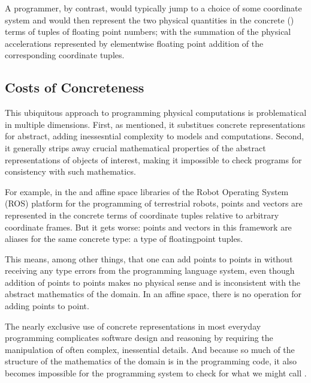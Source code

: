 \documentclass[letterpaper,10pt,english]{sphinxmanual}
\begin{document}
\sphinxAtStartPar
A programmer, by contrast, would typically jump to a choice
of some coordinate system and would then represent the two
physical quantities in the concrete () terms of
tuples of floating point numbers; with the summation of the
physical accelerations represented by element\sphinxhyphen{}wise floating
point addition of the corresponding coordinate tuples.


\subsection{Costs of Concreteness}
\label{\detokenize{A_00_Introduction:costs-of-concreteness}}
\sphinxAtStartPar
This ubiquitous approach to programming physical computations
is problematical in multiple dimensions. First, as mentioned,
it substitues concrete representations for abstract, adding
inessesntial complexity to models and computations. Second,
it generally strips away crucial mathematical properties of
the abstract representations of objects of interest, making
it impossible to check programs for consistency with such
mathematics.

\sphinxAtStartPar
For example, in the  and  affine space libraries of
the Robot Operating System (ROS) platform for the programming
of terrestrial robots, points and vectors are represented in
the concrete terms of coordinate tuples relative to arbitrary
coordinate frames. But it gets worse: points and vectors in
this framework are aliases for the same concrete type: a type
of floating\sphinxhyphen{}point tuples.

\sphinxAtStartPar
This means, among other things, that one can add points to
points in  without receiving any type errors from the
programming language system, even though addition of points
to points makes no physical sense and is inconsistent with
the abstract mathematics of the domain. In an affine space,
there is no operation for adding points to point.

\sphinxAtStartPar
The nearly exclusive use of concrete representations in most
everyday programming complicates software design and reasoning
by requiring the manipulation of often complex, inessential
details. And because so much of the structure of the mathematics
of the domain is  in the programming code, it also
becomes impossible for the programming system to check for what
we might call .
\end{document}
